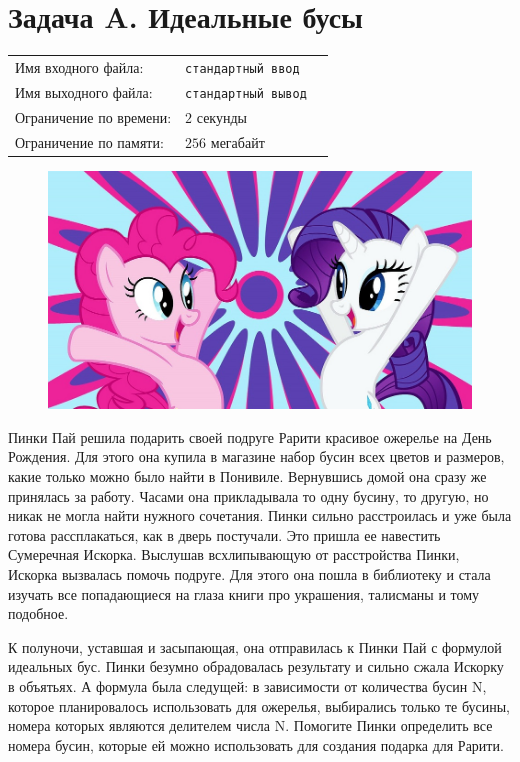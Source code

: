\documentclass[12pt]{scrartcl}
\newcommand{\inputFile}{стандартный ввод}
\newcommand{\outputFile}{стандартный вывод}
\begin{document}
\singlespacing

\section*{Задача A. Идеальные бусы}

\begin{tabularx}{\textwidth}{l l X}
    Имя входного файла: & \texttt{\inputFile} \\
    Имя выходного файла: & \texttt{\outputFile} \\
    Ограничение по времени: & $2$ секунды \\
    Ограничение по памяти: & $256$ мегабайт \\
\end{tabularx}


\begin{figure}[h]
	\centering
    \includegraphics[width=0.6\linewidth]{rarity.jpg}
\end{figure}

Пинки Пай решила подарить своей подруге Рарити красивое ожерелье на День Рождения. Для этого она купила в магазине набор бусин всех цветов и размеров, 
какие только можно было найти в Понивиле. Вернувшись домой она сразу же принялась за работу. Часами она прикладывала то одну бусину, то другую, но никак не могла найти нужного сочетания. 
Пинки сильно расстроилась и уже была готова рассплакаться, как в дверь постучали. Это пришла ее навестить Сумеречная Искорка. Выслушав всхлипывающую от расстройства Пинки, Искорка 
вызвалась помочь подруге. Для этого она пошла в библиотеку и стала изучать все попадающиеся на глаза книги про украшения, талисманы и тому подобное.


К полуночи, уставшая и засыпающая, она отправилась к Пинки Пай с формулой идеальных бус. Пинки безумно обрадовалась результату и сильно сжала Искорку в объятьях.
А формула была следущей: в зависимости от количества бусин N, которое планировалось использовать для ожерелья, выбирались только те бусины, номера которых являются делителем числа N.
Помогите Пинки определить все номера бусин, которые ей можно использовать для создания подарка для Рарити.
\end{document}
